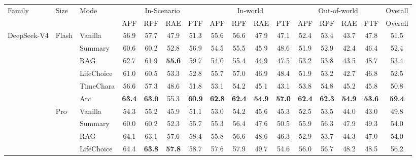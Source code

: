 \documentclass[11pt]{article}
\begin{document}
\begin{table}[t]
\centering
\scriptsize
\setlength{\tabcolsep}{5pt}
\renewcommand{\arraystretch}{0.85}
\setlength{\aboverulesep}{0.2ex}
\setlength{\belowrulesep}{0.2ex}
\begin{tabular}{lllccccccccccccc}
\toprule
Family & Size & Mode & \multicolumn{4}{c}{In-Scenario} & \multicolumn{4}{c}{In-world} & \multicolumn{4}{c}{Out-of-world} & Overall \\
\cmidrule(lr){4-7} \cmidrule(lr){8-11} \cmidrule(lr){12-15} \cmidrule(lr){16-16}
 & & & APF & RPF & RAE & PTF & APF & RPF & RAE & PTF & APF & RPF & RAE & PTF & Overall \\
\midrule
\multirow[t]{12}{*}{DeepSeek-V4} & \multirow[t]{6}{*}{Flash} & Vanilla & 56.9 & 57.7 & 47.9 & 51.3 & 55.6 & 56.6 & 47.9 & 47.1 & 52.4 & 53.4 & 43.7 & 47.8 & 51.5 \\
 &  & Summary & 60.6 & 60.2 & 52.8 & 56.9 & 54.5 & 55.5 & 45.9 & 48.6 & 51.9 & 52.9 & 42.4 & 46.4 & 52.4 \\
 &  & RAG & 62.7 & 61.9 & \textbf{55.6} & 59.7 & 54.0 & 55.4 & 44.9 & 47.5 & 53.2 & 53.8 & 43.5 & 48.7 & 53.4 \\
 &  & LifeChoice & 61.0 & 60.5 & 53.3 & 52.8 & 55.7 & 57.0 & 46.9 & 48.4 & 51.9 & 53.2 & 42.7 & 46.8 & 52.5 \\
 &  & TimeChara & 56.6 & 57.3 & 48.6 & 51.8 & 53.1 & 54.2 & 45.1 & 43.1 & 53.8 & 54.8 & 45.2 & 45.8 & 50.8 \\
 &  & \cellcolor{yellow!15} Arc & \cellcolor{yellow!15} \textbf{63.4} & \cellcolor{yellow!15} \textbf{63.0} & \cellcolor{yellow!15} 55.3 & \cellcolor{yellow!15} \textbf{60.9} & \cellcolor{yellow!15} \textbf{62.8} & \cellcolor{yellow!15} \textbf{62.4} & \cellcolor{yellow!15} \textbf{54.9} & \cellcolor{yellow!15} \textbf{57.0} & \cellcolor{yellow!15} \textbf{62.4} & \cellcolor{yellow!15} \textbf{62.3} & \cellcolor{yellow!15} \textbf{54.9} & \cellcolor{yellow!15} \textbf{53.6} & \cellcolor{yellow!15} \textbf{59.4} \\
\cmidrule(l){2-16}
 & \multirow[t]{6}{*}{Pro} & Vanilla & 54.3 & 55.2 & 45.9 & 51.1 & 53.0 & 54.2 & 45.6 & 45.3 & 52.5 & 53.5 & 44.0 & 43.0 & 49.8 \\
 &  & Summary & 60.0 & 60.2 & 52.3 & 55.7 & 55.3 & 56.4 & 47.6 & 50.5 & 55.9 & 56.3 & 47.9 & 49.3 & 54.0 \\
 &  & RAG & 64.1 & 63.1 & 57.6 & 58.4 & 55.8 & 56.6 & 48.6 & 46.3 & 52.9 & 53.7 & 44.3 & 47.0 & 54.0 \\
 &  & LifeChoice & 64.4 & \textbf{63.8} & \textbf{57.8} & 58.7 & 57.6 & 57.9 & 49.7 & 54.6 & 56.0 & 56.7 & 48.2 & 48.5 & 56.2 \\

\end{tabular}
\end{table}
\end{document}
